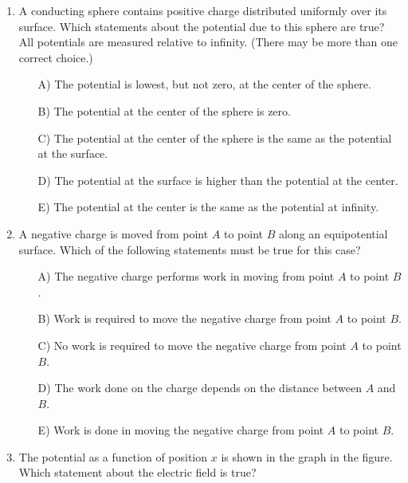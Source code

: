 \begin{enumerate}

\item A conducting sphere contains positive charge distributed uniformly over its surface. Which statements about the potential due to this sphere are true? All potentials are measured relative to infinity. (There may be more than one correct choice.)

\begin{itemize}
    \item[A)] The potential is lowest, but not zero, at the center of the sphere.
    \item[B)] The potential at the center of the sphere is zero.
    \item[C)] The potential at the center of the sphere is the same as the potential at the surface.
    \item[D)] The potential at the surface is higher than the potential at the center.
    \item[E)] The potential at the center is the same as the potential at infinity.
\end{itemize}


\item A negative charge is moved from point $A$ to point $B$ along an equipotential surface. Which of the following statements must be true for this case?

\begin{itemize}
    \item[A)] The negative charge performs work in moving from point $A$ to point $B$.

\item[B)] Work is required to move the negative charge from point $A$ to point $B$.

\item[C)] No work is required to move the negative charge from point $A$ to point $B$.

\item[D)] The work done on the charge depends on the distance between $A$ and $B$.

\item[E)] Work is done in moving the negative charge from point $A$ to point $B$.
\end{itemize}


\item The potential as a function of position $x$ is shown in the graph in the figure. Which statement about the electric field is true?


\end{enumerate}

